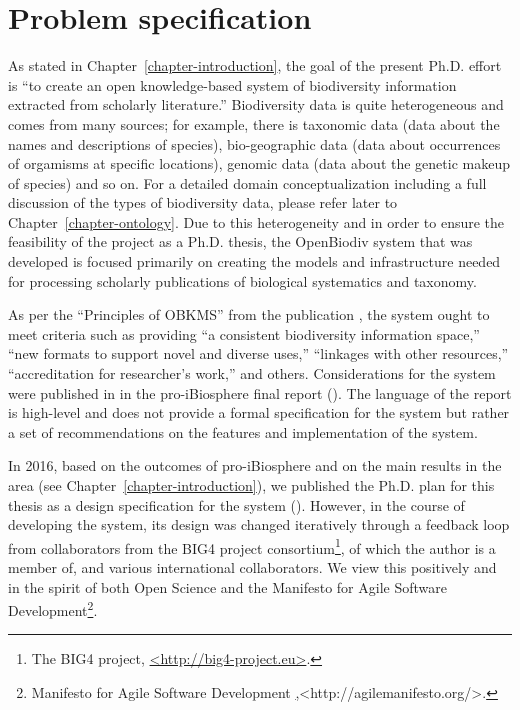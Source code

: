 \chapter{Problem specification}
\label{chapter-problem-defintion}

As stated in Chapter~\ref{chapter-introduction}, the goal of the present Ph.D. effort is ``to create an open knowledge-based system of biodiversity information extracted from scholarly literature.'' Biodiversity data is quite heterogeneous and comes from many sources; for example, there is taxonomic data (data about the names and descriptions of species), bio-geographic data (data about occurrences of orgamisms at specific locations), genomic data (data about the genetic makeup of species) and so on. For a detailed domain conceptualization including a full discussion of the types of biodiversity data, please refer later to Chapter~\ref{chapter-ontology}. Due to this heterogeneity and in order to ensure the feasibility of the project as a Ph.D. thesis, the OpenBiodiv system that was developed is focused primarily on creating the models and infrastructure needed for processing scholarly publications of biological systematics and taxonomy. 

As per the ``Principles of OBKMS'' from the publication \cite{pro-ibiosphere_open_2014}, the system ought to meet criteria such as providing ``a consistent biodiversity information space,'' ``new formats to support novel and diverse uses,'' ``linkages with other resources,'' ``accreditation for researcher's work,'' and others. Considerations for the system were published in in the pro-iBiosphere final report (\cite{soraya_sierra_coordination_2014}). The language of the report is high-level and does not provide a formal specification for the system but rather a set of recommendations on the features and implementation of the system.

In 2016, based on the outcomes of pro-iBiosphere and on the main results in the area (see Chapter~\ref{chapter-introduction}), we published the Ph.D. plan for this thesis as a design specification for the system (\cite{senderov_open_2016}). However, in the course of developing the system, its design was changed iteratively through a feedback loop from collaborators from the BIG4 project consortium\footnote{The BIG4 project, \href{http://big4-project.eu}{<http://big4-project.eu>}.}, of which the author is a member of, and various international collaborators. We view this positively and in the spirit of both Open Science and the Manifesto for Agile Software Development\footnote{Manifesto for Agile Software Development \href{http://agilemanifesto.org/},{<http://agilemanifesto.org/>}.}.

